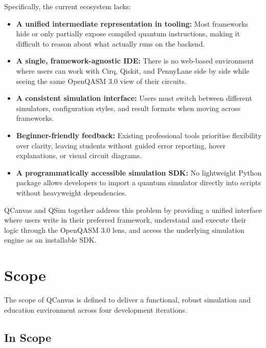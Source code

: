 Specifically, the current ecosystem lacks:

\begin{itemize}
    \item \textbf{A unified intermediate representation in tooling:} Most frameworks hide or only partially expose compiled quantum instructions, making it difficult to reason about what actually runs on the backend.
    \item \textbf{A single, framework-agnostic IDE:} There is no web-based environment where users can work with Cirq, Qiskit, and PennyLane side by side while seeing the same OpenQASM 3.0 view of their circuits.
    \item \textbf{A consistent simulation interface:} Users must switch between different simulators, configuration styles, and result formats when moving across frameworks.
    \item \textbf{Beginner-friendly feedback:} Existing professional tools prioritise flexibility over clarity, leaving students without guided error reporting, hover explanations, or visual circuit diagrams.
    \item \textbf{A programmatically accessible simulation SDK:} No lightweight Python package allows developers to import a quantum simulator directly into scripts without heavyweight dependencies.
\end{itemize}

QCanvas and QSim together address this problem by providing a unified interface where users write in their preferred framework, understand and execute their logic through the OpenQASM 3.0 lens, and access the underlying simulation engine as an installable SDK.

\section{Scope}

The scope of QCanvas is defined to deliver a functional, robust simulation and education environment across four development iterations.

\subsection{In Scope}

